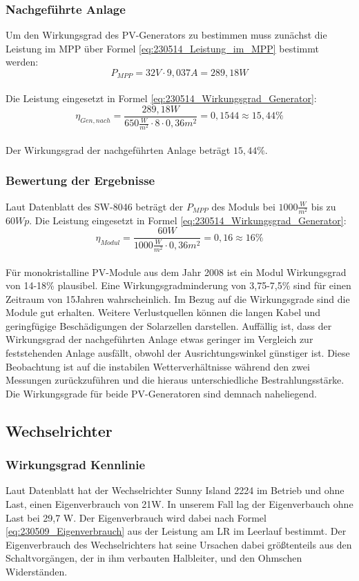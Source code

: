 \subsubsection{Nachgeführte Anlage}
Um den Wirkungsgrad des PV-Generators zu bestimmen muss zunächst die Leistung im MPP über Formel \autoref{eq:230514_Leistung_im_MPP} bestimmt werden:
\\
$$P_{MPP} = 32V \cdot 9,037A = 289,18W$$ \\
Die Leistung eingesetzt in Formel \autoref{eq:230514_Wirkungsgrad_Generator}:\\
$$\eta_{Gen,nach}=\frac{289,18W}{650\frac{W}{m^2}\cdot 8\cdot 0,36 m^2}
=0,1544\approx 15,44\%$$\\
Der Wirkungsgrad der nachgeführten Anlage beträgt $15,44\%$.
\subsubsection{Bewertung der Ergebnisse}

Laut Datenblatt des SW-8046 beträgt der $P_{MPP}$ des Moduls bei $1000\frac{W}{m^2}$ bis zu $60Wp$.
Die Leistung eingesetzt in Formel \autoref{eq:230514_Wirkungsgrad_Generator}:\\
$$\eta_{Modul}=\frac{60W}{1000\frac{W}{m^2}\cdot 0,36 m^2}
=0,16\approx 16\%$$\\
Für monokristalline PV-Module aus dem Jahr 2008 ist ein Modul Wirkungsgrad von 14-18\% plausibel. Eine Wirkungsgradminderung von 3,75-7,5\% sind für einen Zeitraum von 15Jahren wahrscheinlich. Im Bezug auf die Wirkungsgrade sind die Module gut erhalten. Weitere Verlustquellen können die langen Kabel und geringfügige Beschädigungen der Solarzellen darstellen. Auffällig ist, dass der Wirkungsgrad der nachgeführten Anlage etwas geringer im Vergleich zur feststehenden Anlage ausfällt, obwohl der Ausrichtungswinkel günstiger ist. Diese Beobachtung ist auf die instabilen Wetterverhältnisse während den zwei Messungen zurückzuführen und die hieraus unterschiedliche Bestrahlungsstärke.
Die Wirkungsgrade für beide PV-Generatoren sind demnach naheliegend.


\subsection{Wechselrichter}
\subsubsection{Wirkungsgrad Kennlinie}
Laut Datenblatt hat der Wechselrichter Sunny Island 2224 im Betrieb und ohne Last, einen Eigenverbrauch von 21W. 
In unserem Fall lag der Eigenverbauch ohne Last bei 29,7 W. 
Der Eigenverbrauch wird dabei nach Formel \autoref{eq:230509_Eigenverbrauch} aus der Leistung am LR im Leerlauf bestimmt. 
Der Eigenverbrauch des Wechselrichters hat seine Ursachen dabei größtenteils aus den Schaltvorgängen, der in ihm verbauten Halbleiter, und den Ohmschen Widerständen.

